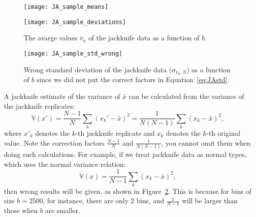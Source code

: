 \begin{figure}[H]
    \centering
    \begin{minipage}[t]{0.8\linewidth}
        \centering
        \texttt{[image: JA\_sample\_means]}
        \label{fig:JA_sample_means:a}
    \end{minipage}
    \hfill
    \begin{minipage}[t]{0.8\linewidth}
        \centering
        \texttt{[image: JA\_sample\_deviations]}
        \label{fig:JA_sample_means:b}
    \end{minipage}
    \caption{The avarge values \(\bar{v}_a\) of the jackknife data as a function of \(b\).}
    \label{fig:JA_sample_means}
\end{figure}

\begin{figure}
    \centering
    \texttt{[image: JA\_sample\_std\_wrong]}
    \caption{Wrong standard deviation of the jackknife data (\(\sigma_{\bar{v}_a,N}\)) as a
        function of \(b\) since we did not put the correct factors in
        Equation~\eqref{eq:JAstd}.}
    \label{fig:JA_sample_std_wrong}
\end{figure}

A jackknife estimate of the variance of \(\bar{x}\) can be calculated from the variance of
the jackknife replicates:
%
\begin{equation}\label{eq:JAstd}
    \mathbb{ V }(x') = \frac{ N - 1 }{ N } \sum_k (x_k' - \bar{x})^2
    = \frac{ 1 }{ N (N - 1) } \sum_k (x_k - \bar{x})^2,
\end{equation}
%
where \(x'_k\) denotes the \(k\)-th jackknife replicate and \(x_k\) denotes the \(k\)-th
original value.
Note the correction factors \(\frac{ N - 1 }{ N }\) and \(\frac{ 1 }{ N (N - 1) }\),
you cannot omit them when doing such calculations. For example, if we treat
jackknife data as normal  types, which uses the normal variance relation:
%
\begin{equation}
    \mathbb{ V }(x) = \frac{ 1 }{ N - 1 } \sum_k (x_k - \bar{x})^2,
\end{equation}
%
then wrong results will be given, as shown in Figure~\ref{fig:JA_sample_std_wrong}.
This is because for bins of size \(b=2500\), for instance, there are only \(2\)
bins, and \(\frac{ 1 }{ N - 1 }\) will be larger than those when \(b\) are smaller.

